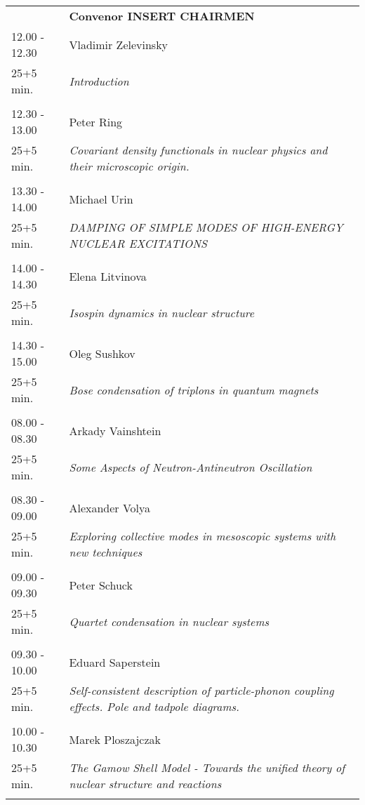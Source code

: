 \begin{longtable}{p{3cm}p{13cm}}
&\hfill {\bf Convenor INSERT CHAIRMEN }\\ 
12.00 - 12.30 & Vladimir Zelevinsky\\ 
25+5 min. & {\it Introduction}\\ 
 & \\ 
12.30 - 13.00 & Peter Ring\\ 
25+5 min. & {\it Covariant density functionals in nuclear physics and their microscopic origin.}\\ 
 & \\ 
13.30 - 14.00 & Michael Urin\\ 
25+5 min. & {\it DAMPING OF SIMPLE MODES OF HIGH-ENERGY NUCLEAR EXCITATIONS}\\ 
 & \\ 
14.00 - 14.30 & Elena Litvinova\\ 
25+5 min. & {\it Isospin dynamics in nuclear structure}\\ 
 & \\ 
14.30 - 15.00 & Oleg Sushkov\\ 
25+5 min. & {\it Bose condensation of triplons in quantum magnets}\\ 
 & \\ 
08.00 - 08.30 & Arkady Vainshtein\\ 
25+5 min. & {\it Some Aspects of Neutron-Antineutron Oscillation}\\ 
 & \\ 
08.30 - 09.00 & Alexander Volya\\ 
25+5 min. & {\it Exploring collective modes in mesoscopic systems with new techniques}\\ 
 & \\ 
09.00 - 09.30 & Peter Schuck\\ 
25+5 min. & {\it Quartet condensation in nuclear systems}\\ 
 & \\ 
09.30 - 10.00 & Eduard Saperstein\\ 
25+5 min. & {\it Self-consistent description of particle-phonon coupling effects. Pole and tadpole diagrams.}\\ 
 & \\ 
10.00 - 10.30 & Marek Ploszajczak\\ 
25+5 min. & {\it The Gamow Shell Model - Towards the unified theory of nuclear structure and reactions}\\ 
 & \\ 
\end{longtable}

